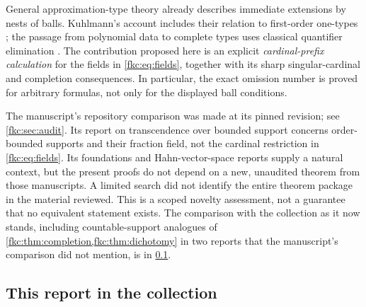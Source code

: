 \documentclass[11pt,letterpaper]{article}
\numberwithin{equation}{section}
\theoremstyle{definition}
\theoremstyle{remark}
\begin{document}
General approximation-type theory already describes immediate extensions by nests of balls. Kuhlmann's account includes their relation to first-order one-types \cite{FK}; the passage from polynomial data to complete types uses classical quantifier elimination \cite{Tarski,Robinson,Yin}. The contribution proposed here is an explicit \emph{cardinal-prefix calculation} for the fields in \eqref{fkc:eq:fields}, together with its sharp singular-cardinal and completion consequences. In particular, the exact omission number is proved for arbitrary formulas, not only for the displayed ball conditions.

The manuscript's repository comparison was made at its pinned revision; see \cref{fkc:sec:audit}. Its report on transcendence over bounded support concerns order-bounded supports and their fraction field, not the cardinal restriction in \eqref{fkc:eq:fields}. Its foundations and Hahn-vector-space reports supply a natural context, but the present proofs do not depend on a new, unaudited theorem from those manuscripts. A limited search did not identify the entire theorem package in the material reviewed. This is a scoped novelty assessment, not a guarantee that no equivalent statement exists. The comparison with the collection as it now stands, including countable-support analogues of \cref{fkc:thm:completion,fkc:thm:dichotomy} in two reports that the manuscript's comparison did not mention, is in \cref{fkc:subsec:collection}.

\subsection{This report in the collection}
\label{fkc:subsec:collection}
\end{document}
